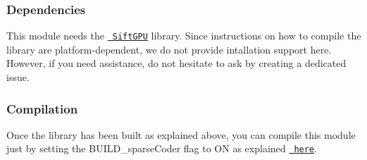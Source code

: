 \subsubsection*{Dependencies}

This module needs the \href{https://github.com/pitzer/SiftGPU}{\texttt{ Sift\+G\+PU}} library. Since instructions on how to compile the library are platform-\/dependent, we do not provide intallation support here. However, if you need assistance, do not hesitate to ask by creating a dedicated issue.

\subsubsection*{Compilation}

Once the library has been built as explained above, you can compile this module just by setting the {\ttfamily B\+U\+I\+L\+D\+\_\+sparse\+Coder} flag to {\ttfamily ON} as explained \href{https://www.github.com/robotology/himrep\#compilation}{\texttt{ here}}. 